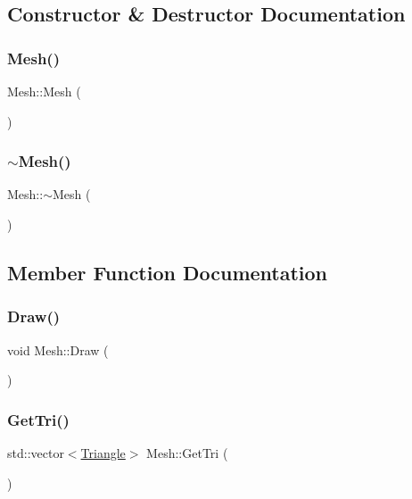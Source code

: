 \subsection{Constructor \& Destructor Documentation}
\mbox{\label{class_mesh_a2af137f1571af89172b9c102302c416b}} 
\subsubsection{\texorpdfstring{Mesh()}{Mesh()}}
{\footnotesize\ttfamily Mesh\+::\+Mesh (\begin{DoxyParamCaption}{ }\end{DoxyParamCaption})}

\mbox{\label{class_mesh_a5efe4da1a4c0971cfb037bd70304c303}} 
\subsubsection{\texorpdfstring{$\sim$\+Mesh()}{~Mesh()}}
{\footnotesize\ttfamily Mesh\+::$\sim$\+Mesh (\begin{DoxyParamCaption}{ }\end{DoxyParamCaption})}



\subsection{Member Function Documentation}
\mbox{\label{class_mesh_afdd95c079fd0442afef8a6c421c8bfc9}} 
\subsubsection{\texorpdfstring{Draw()}{Draw()}}
{\footnotesize\ttfamily void Mesh\+::\+Draw (\begin{DoxyParamCaption}{ }\end{DoxyParamCaption})}

\mbox{\label{class_mesh_aa5879d3423821995b768a85130449999}} 
\subsubsection{\texorpdfstring{Get\+Tri()}{GetTri()}}
{\footnotesize\ttfamily std\+::vector$<$\hyperlink{struct_triangle}{Triangle}$>$ Mesh\+::\+Get\+Tri (\begin{DoxyParamCaption}{ }\end{DoxyParamCaption})\hspace{0.3cm}{\ttfamily [inline]}}

